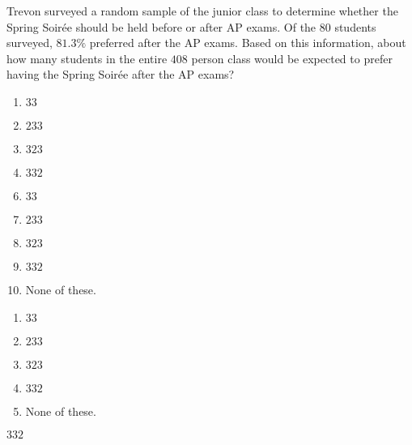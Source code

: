  
Trevon surveyed a random sample of the junior class to determine whether the Spring Soir\'ee should be held before or after AP exams.  Of the $80$ students surveyed, $81.3\%$ preferred after the AP exams.  Based on this information, about how many students in the entire $408$ person class would be expected to prefer having the Spring Soir\'ee after the AP exams?


\ifsat
	\begin{enumerate}[label=\Alph*)]
		\item $33 $ 
		\item $233 $ 
		\item $323 $ 
		\item $332 $ %
	\end{enumerate}
\else
\fi

\ifacteven
	\begin{enumerate}[label=\textbf{\Alph*.},itemsep=\fill,align=left]
		\setcounter{enumii}{5}
		\item $33 $ 
		\item $233 $ 
		\item $323 $ 
		\addtocounter{enumii}{1}
		\item $332 $ %
		\item None of these. 
	\end{enumerate}
\else
\fi

\ifactodd
	\begin{enumerate}[label=\textbf{\Alph*.},itemsep=\fill,align=left]
		\item $33 $ 
		\item $233 $ 
		\item $323 $ 
		\item $332 $ %
		\item None of these. 
	\end{enumerate}
\else
\fi

\ifgridin
 $332 $ %

\else
\fi

